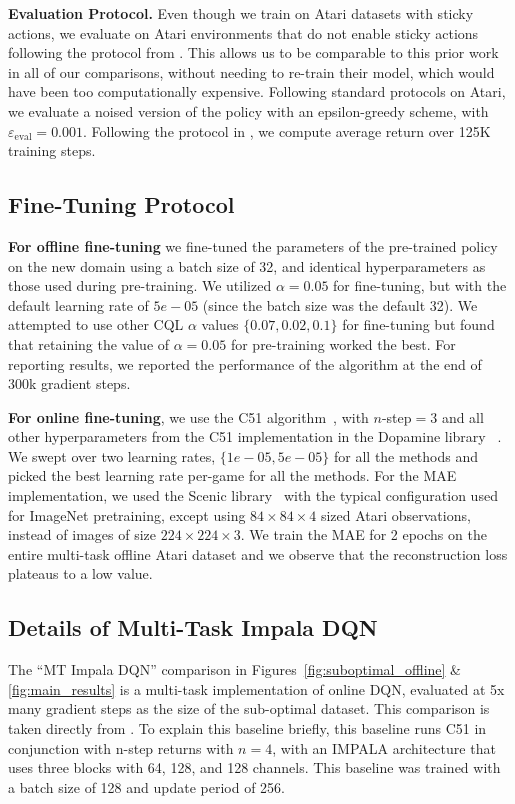 \textbf{Evaluation Protocol.} Even though we train on Atari datasets with sticky actions, we evaluate on Atari environments that do not enable sticky actions following the protocol from \citet{lee2022multi}. This allows us to be comparable to this prior work in all of our comparisons, without needing to re-train their model, which would have been too computationally expensive. Following standard protocols on Atari, we evaluate a noised version of the policy with an epsilon-greedy scheme, with $\varepsilon_\text{eval} = 0.001$. Following the protocol in \citet{castro2018dopamine}, we compute average return over 125K training steps. 

\subsection{Fine-Tuning Protocol}
\label{sec:finetuning}

\textbf{For offline fine-tuning} we fine-tuned the parameters of the pre-trained policy on the new domain using a batch size of 32, and identical hyperparameters as those used during pre-training. We utilized $\alpha=0.05$ for fine-tuning, but with the default learning rate of $5e-05$ (since the batch size was the default 32). We attempted to use other CQL $\alpha$ values $\{0.07, 0.02, 0.1\}$ for fine-tuning but found that retaining the value of $\alpha = 0.05$ for pre-training worked the best. For reporting results, we reported the performance of the algorithm at the end of 300k gradient steps.  

\textbf{For online fine-tuning}, we use the C51 algorithm~\citep{bellemare2017distributional}, with $n$-step$=3$ and all other hyperparameters from the C51 implementation in the Dopamine library ~\citep{castro2018dopamine}. We swept over two learning rates, $\{1e-05, 5e-05\}$ for all the methods and picked the best learning rate per-game for all the methods. For the MAE implementation, we used the Scenic library~\citep{dehghani2021scenic} with the typical configuration used for ImageNet pretraining, except using $84\times84\times4$ sized Atari observations, instead of images of size $224 \times 224 \times 3$. We train the MAE for 2 epochs on the entire multi-task offline Atari dataset and we observe that the reconstruction loss plateaus to a low value.

\subsection{{Details of Multi-Task Impala DQN}}
\label{sec:online_mt_dqn}
{The ``MT Impala DQN'' comparison in Figures~\ref{fig:suboptimal_offline} \& \ref{fig:main_results} is a multi-task implementation of online DQN, evaluated at 5x many gradient steps as the size of the sub-optimal dataset. This comparison is taken directly from \citet{lee2022multi}. To explain this baseline briefly, this baseline runs C51 in conjunction with n-step returns with $n=4$, with an IMPALA architecture that uses three blocks with 64, 128, and 128 channels. This baseline was trained with a batch size of 128 and update period of 256.}



